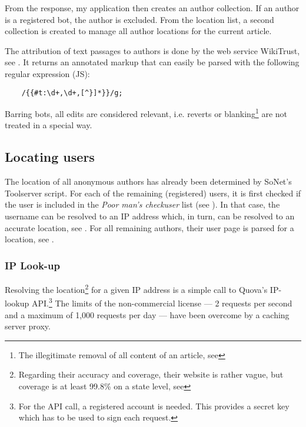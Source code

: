 From the response, my application then creates an author collection.
If an author is a registered bot, the author is excluded.
From the location list, a second collection is created to manage all author locations for the current article. 

The attribution of text passages to authors is done by the web service WikiTrust, see . 
It returns an annotated markup that can easily be parsed with the following regular expression (JS):

\lstset{caption=,label=wikitrustre,language=HTML,numbers=none}
\begin{lstlisting}
	/{{#t:\d+,\d+,[^}]*}}/g;
\end{lstlisting}

Barring bots, all edits are considered relevant, i.e. reverts or blanking\footnote{The illegitimate removal of all content of an article, see } are not treated in a special way.


\subsection{Locating users}

The location of all anonymous authors has already been determined by SoNet's Toolserver script.
For each of the remaining (registered) users, it is first checked if the user is included in the \emph{Poor man's checkuser} list (see ).
In that case, the username can be resolved to an \ac{IP} address which, in turn, can be resolved to an accurate location, see .
For all remaining authors, their user page is parsed for a location, see .


\subsubsection{IP Look-up}\label{sub:iplookup}

Resolving the location\footnote{Regarding their accuracy and coverage, their website is rather vague, but coverage is at least 99.8\% on a state level, see } for a given \ac{IP} address is a simple call to Quova's IP-lookup \ac{API}.\footnote{For the \ac{API} call, a registered account is needed. This provides a secret key which has to be used to sign each request.}
The limits of the non-commercial license --- 2 requests per second and a maximum of 1,000 requests per day --- have been overcome by a caching server proxy.


